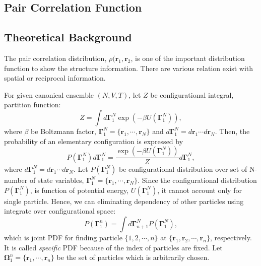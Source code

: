 \documentclass[10pt, a4paper]{article}
\begin{document}
\begin{appendices}
  \section{Pair Correlation Function}
  \label{appen_rdf}
  \subsection{Theoretical Background}
  The pair correlation distribution, $\rho(\mathbf{r}_1, \mathbf{r}_2$, is one of the important distribution function to show the structure information. There are various relation exist with spatial or reciprocal information.

  For given canonical ensemble $(N, V, T)$, let $Z$ be configurational integral, partition function:
  \begin{equation}
    Z = \int d\boldsymbol{\Gamma}_{1}^{N} \exp\left(-\beta U(\boldsymbol{\Gamma}_{1}^{N})\right),
  \end{equation}
  where $\beta$ be Boltzmann factor, $\boldsymbol{\Gamma}_{1}^{N} = \{\mathbf{r}_1,\cdots,\mathbf{r}_N\}$ and $d\boldsymbol{\Gamma}_{1}^{N} = d\mathbf{r}_1\cdots d\mathbf{r}_N$. Then, the probability of an elementary configuration is expressed by
  \begin{equation}
    P(\boldsymbol{\Gamma}_{1}^{N})d\boldsymbol{\Gamma}_{1}^{N} = \frac{\exp\left(-\beta U(\boldsymbol{\Gamma}_{1}^{N})\right)}{Z}d\boldsymbol{\Gamma}_{1}^{N},
  \end{equation}
  where $d\boldsymbol{\Gamma}_{1}^{N} = d\mathbf{r}_1\cdots d\mathbf{r}_N$.
  Let $P(\boldsymbol{\Gamma}_{1}^{N})$ be configurational distribution over set of N-number of state variables, $\boldsymbol{\Gamma}_{1}^{N} = \{\mathbf{r}_1, \cdots, \mathbf{r}_N\}$. Since the configurational distribution $P(\boldsymbol{\Gamma}_{1}^{N})$, is function of potential energy, $U(\boldsymbol{\Gamma}_{1}^{N})$, it cannot account only for single particle. Hence, we can eliminating dependency of other particles using integrate over configurational space:
  \begin{equation}
    P(\boldsymbol{\Gamma}_{1}^{n}) = \int d\boldsymbol{\Gamma}_{n+1}^{N} P(\boldsymbol{\Gamma}_{1}^{N}),
    \label{eq:reduced_configuration_distribution}
  \end{equation}
  which is joint PDF for finding particle $\{1, 2, \cdots, n\}$ at $\{\mathbf{r}_1, \mathbf{r}_2, \cdots, \mathbf{r}_n\}$, respectively. It is called \textit{specific} PDF because of the index of particles are fixed.
  Let $\boldsymbol{\Omega}_{1}^{n} = \{\mathbf{r}_1,\cdots,\mathbf{r}_n\}$ be the set of particles which is arbitrarily chosen.

\end{appendices}
\end{document}
